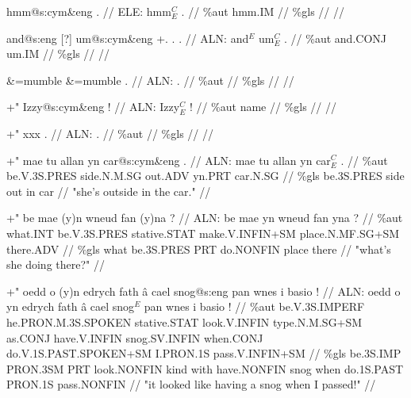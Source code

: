 \documentclass[a4paper,10pt]{article}
\begin{document}
\ex
\begingl[lingstyle=gergl]
\glchat hmm@s:cym\&eng . //
\glsurface ELE:  hmm$^{C}_{E}$ .  //
\glauto \%aut  hmm{\scriptsize .IM}   //
\glmanual \%gls     //
\gleng  //
\endgl
\xe

\ex
\begingl[lingstyle=gergl]
\glchat and@s:eng [?] um@s:cym\&eng +. . . //
\glsurface ALN:  and$^{E}$ um$^{C}_{E}$ .  //
\glauto \%aut  and{\scriptsize .CONJ} um{\scriptsize .IM}   //
\glmanual \%gls      //
\gleng  //
\endgl
\xe

\ex
\begingl[lingstyle=gergl]
\glchat \&=mumble \&=mumble . //
\glsurface ALN:  .  //
\glauto \%aut    //
\glmanual \%gls    //
\gleng  //
\endgl
\xe

\ex
\begingl[lingstyle=gergl]
\glchat +" Izzy@s:cym\&eng ! //
\glsurface ALN:  Izzy$^{C}_{E}$ !  //
\glauto \%aut  name   //
\glmanual \%gls     //
\gleng  //
\endgl
\xe

\ex
\begingl[lingstyle=gergl]
\glchat +" xxx . //
\glsurface ALN:  .  //
\glauto \%aut    //
\glmanual \%gls    //
\gleng  //
\endgl
\xe

\ex
\begingl[lingstyle=gergl]
\glchat +" mae tu allan yn car@s:cym\&eng . //
\glsurface ALN:  mae tu allan yn car$^{C}_{E}$ .  //
\glauto \%aut  be{\scriptsize .V.3S.PRES} side{\scriptsize .N.M.SG} out{\scriptsize .ADV} yn{\scriptsize .PRT} car{\scriptsize .N.SG}   //
\glmanual \%gls  be{\scriptsize .3S.PRES} side out in car   //
\gleng "she's outside in the car." //
\endgl
\xe

\ex
\begingl[lingstyle=gergl]
\glchat +" be mae (y)n wneud fan (y)na ? //
\glsurface ALN:  be mae yn wneud fan yna ?  //
\glauto \%aut  what{\scriptsize .INT} be{\scriptsize .V.3S.PRES} stative{\scriptsize .STAT} make{\scriptsize .V.INFIN+SM} place{\scriptsize .N.MF.SG+SM} there{\scriptsize .ADV}   //
\glmanual \%gls  what be{\scriptsize .3S.PRES} PRT do{\scriptsize .NONFIN} place there   //
\gleng "what's she doing there?" //
\endgl
\xe

\ex
\begingl[lingstyle=gergl]
\glchat +" oedd o (y)n edrych fath â cael snog@s:eng pan wnes i basio ! //
\glsurface ALN:  oedd o yn edrych fath â cael snog$^{E}$ pan wnes i basio !  //
\glauto \%aut  be{\scriptsize .V.3S.IMPERF} he{\scriptsize .PRON.M.3S.SPOKEN} stative{\scriptsize .STAT} look{\scriptsize .V.INFIN} type{\scriptsize .N.M.SG+SM} as{\scriptsize .CONJ} have{\scriptsize .V.INFIN} snog{\scriptsize .SV.INFIN} when{\scriptsize .CONJ} do{\scriptsize .V.1S.PAST.SPOKEN+SM} I{\scriptsize .PRON.1S} pass{\scriptsize .V.INFIN+SM}   //
\glmanual \%gls  be{\scriptsize .3S.IMP} PRON{\scriptsize .3SM} PRT look{\scriptsize .NONFIN} kind with have{\scriptsize .NONFIN} snog when do{\scriptsize .1S.PAST} PRON{\scriptsize .1S} pass{\scriptsize .NONFIN}   //
\gleng "it looked like having a snog when I passed!" //
\endgl
\xe
\end{document}
